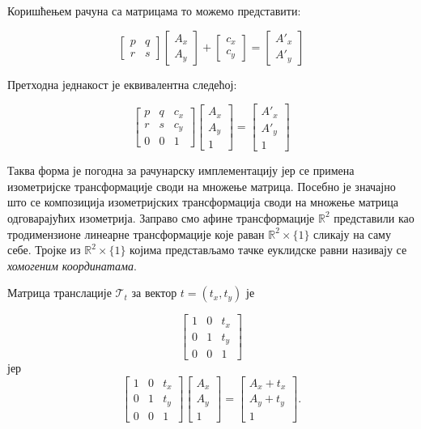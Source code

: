 \documentclass[12pt]{article}
\begin{document}
Коришћењем
рачуна са матрицама то можемо представити:

\[\begin{bmatrix}p & q\\ r & s\end{bmatrix} \begin{bmatrix}A_x\\ A_y \end{bmatrix} + \begin{bmatrix}c_x\\ c_y\end{bmatrix} = \begin{bmatrix}A'_x\\ A'_y \end{bmatrix}\]

Претходна једнакост је еквивалентна следећој:

\[\begin{bmatrix}p & q & c_x\\ r & s&c_y \\ 0 & 0 & 1\end{bmatrix} \begin{bmatrix}A_x\\ A_y\\1\end{bmatrix} = 
\begin{bmatrix}A'_x\\ A'_y\\1\end{bmatrix}\]

Таква форма је погодна за рачунарску имплементацију јер се примена изометријске трансформације своди на  множење матрица. Посебно је значајно што се композиција изометријских трансформација своди на множење матрица одговарајућих изометрија. Заправо смо афине трансформације $\mathbb{R}^2$ представили као тродимензионе линеарне трансформације које раван $\mathbb{R}^2 \times \{ 1 \}$  сликају на саму себе. Тројке из $\mathbb{R}^2 \times \{ 1 \}$ којима представљамо тачке еуклидске равни називају се \emph{хомогеним координатама}.

Матрица транслације $\mathcal{T}_t$ за вектор \( t = (t_x, t_y)\) је 

\[\begin{bmatrix}1 & 0 & t_x\\ 0 & 1&t_y \\ 0 & 0 & 1\end{bmatrix} \] 
јер
\[\begin{bmatrix}1 & 0 & t_x\\ 0 & 1&t_y \\ 0 & 0 & 1\end{bmatrix} \begin{bmatrix}A_x\\ A_y\\1\end{bmatrix} = 
\begin{bmatrix}A_x+t_x\\ A_y+t_y\\1\end{bmatrix}.\]
\end{document}

